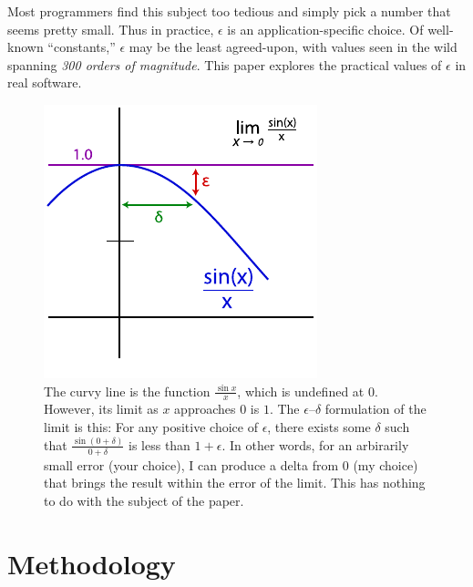 \documentclass[twocolumn]{article}
\begin{document}
Most programmers find this subject too tedious and simply pick a
number that seems pretty small. Thus in practice, $\epsilon$ is an
application-specific choice. Of well-known ``constants,''
$\epsilon$ may be the least agreed-upon, with values seen in the wild
spanning {\em 300 orders of magnitude}. This paper explores the practical
values of $\epsilon$ in real software.

\begin{figure}[ht]
\begin{center}
\includegraphics[width=0.90 \linewidth]{epsilondelta.pdf}
\end{center}\vspace{-0.1in}
\caption{ The curvy line is the function $\frac{\sin x}{x}$, which is
  undefined at $0$. However, its limit as $x$ approaches $0$ is $1$.
  The $\epsilon$--$\delta$ formulation of the limit is this: For any
  positive choice of $\epsilon$, there exists some $\delta$ such that
  $\frac{\sin (0 + \delta)}{0 + \delta}$ is less than $1 + \epsilon$.
  In other words, for an arbirarily small error (your choice), I
  can produce a delta from $0$ (my choice) that brings the result
  within the error of the limit. This has nothing to do with the
  subject of the paper.}
\label{fig:epsilondelta}
\end{figure}

\section{Methodology}
\end{document}
